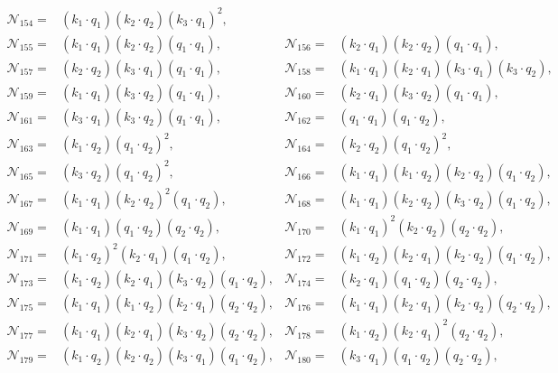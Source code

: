 \documentclass[twocolumn,aps,showpacs,nofootinbib,superscriptaddress,prd]{revtex4-2}
\begin{document}
\begin{widetext}
\begin{align}
{\mathcal N}_{154}=&(k_1\cdot q_1) (k_2\cdot q_2) (k_3\cdot q_1)^2,\nonumber\\
{\mathcal N}_{155}=&(k_1\cdot q_1) (k_2\cdot q_2) (q_1\cdot q_1),&
{\mathcal N}_{156}=&(k_2\cdot q_1) (k_2\cdot q_2) (q_1\cdot q_1),\nonumber\\
{\mathcal N}_{157}=&(k_2\cdot q_2) (k_3\cdot q_1) (q_1\cdot q_1),&
{\mathcal N}_{158}=&(k_1\cdot q_1) (k_2\cdot q_1) (k_3\cdot q_1) (k_3\cdot q_2),\nonumber\\
{\mathcal N}_{159}=&(k_1\cdot q_1) (k_3\cdot q_2) (q_1\cdot q_1),&
{\mathcal N}_{160}=&(k_2\cdot q_1) (k_3\cdot q_2) (q_1\cdot q_1),\nonumber\\
{\mathcal N}_{161}=&(k_3\cdot q_1) (k_3\cdot q_2) (q_1\cdot q_1),&
{\mathcal N}_{162}=&(q_1\cdot q_1) (q_1\cdot q_2),\nonumber\\
{\mathcal N}_{163}=&(k_1\cdot q_2) (q_1\cdot q_2)^2,&
{\mathcal N}_{164}=&(k_2\cdot q_2) (q_1\cdot q_2)^2,\nonumber\\
{\mathcal N}_{165}=&(k_3\cdot q_2) (q_1\cdot q_2)^2,&
{\mathcal N}_{166}=&(k_1\cdot q_1) (k_1\cdot q_2) (k_2\cdot q_2) (q_1\cdot q_2),\nonumber\\
{\mathcal N}_{167}=&(k_1\cdot q_1) (k_2\cdot q_2)^2 (q_1\cdot q_2),&
{\mathcal N}_{168}=&(k_1\cdot q_1) (k_2\cdot q_2) (k_3\cdot q_2) (q_1\cdot q_2),\nonumber\\
{\mathcal N}_{169}=&(k_1\cdot q_1) (q_1\cdot q_2) (q_2\cdot q_2),&
{\mathcal N}_{170}=&(k_1\cdot q_1)^2 (k_2\cdot q_2) (q_2\cdot q_2),\nonumber\\
{\mathcal N}_{171}=&(k_1\cdot q_2)^2 (k_2\cdot q_1) (q_1\cdot q_2),&
{\mathcal N}_{172}=&(k_1\cdot q_2) (k_2\cdot q_1) (k_2\cdot q_2) (q_1\cdot q_2),\nonumber\\
{\mathcal N}_{173}=&(k_1\cdot q_2) (k_2\cdot q_1) (k_3\cdot q_2) (q_1\cdot q_2),&
{\mathcal N}_{174}=&(k_2\cdot q_1) (q_1\cdot q_2) (q_2\cdot q_2),\nonumber\\
{\mathcal N}_{175}=&(k_1\cdot q_1) (k_1\cdot q_2) (k_2\cdot q_1) (q_2\cdot q_2),&
{\mathcal N}_{176}=&(k_1\cdot q_1) (k_2\cdot q_1) (k_2\cdot q_2) (q_2\cdot q_2),\nonumber\\
{\mathcal N}_{177}=&(k_1\cdot q_1) (k_2\cdot q_1) (k_3\cdot q_2) (q_2\cdot q_2),&
{\mathcal N}_{178}=&(k_1\cdot q_2) (k_2\cdot q_1)^2 (q_2\cdot q_2),\nonumber\\
{\mathcal N}_{179}=&(k_1\cdot q_2) (k_2\cdot q_2) (k_3\cdot q_1) (q_1\cdot q_2),&
{\mathcal N}_{180}=&(k_3\cdot q_1) (q_1\cdot q_2) (q_2\cdot q_2),\nonumber\\

\end{align}
\end{widetext}
\end{document}
